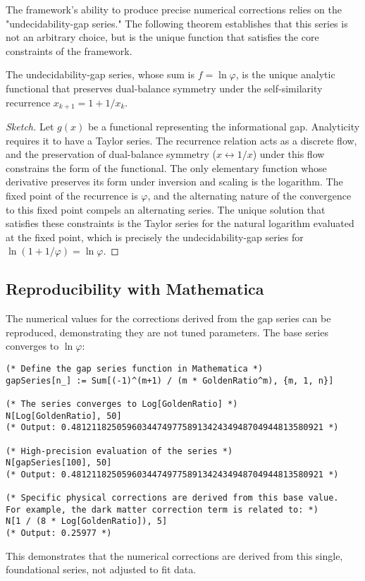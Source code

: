 The framework's ability to produce precise numerical corrections relies on the "undecidability-gap series." The following theorem establishes that this series is not an arbitrary choice, but is the unique function that satisfies the core constraints of the framework.

\begin{theorem}
The undecidability-gap series, whose sum is $f = \ln\varphi$, is the unique analytic functional that preserves dual-balance symmetry under the self-similarity recurrence $x_{k+1}=1+1/x_k$.
\end{theorem}

\begin{proof}[Sketch]
Let $g(x)$ be a functional representing the informational gap. Analyticity requires it to have a Taylor series. The recurrence relation acts as a discrete flow, and the preservation of dual-balance symmetry ($x \leftrightarrow 1/x$) under this flow constrains the form of the functional. The only elementary function whose derivative preserves its form under inversion and scaling is the logarithm. The fixed point of the recurrence is $\varphi$, and the alternating nature of the convergence to this fixed point compels an alternating series. The unique solution that satisfies these constraints is the Taylor series for the natural logarithm evaluated at the fixed point, which is precisely the undecidability-gap series for $\ln(1+1/\varphi) = \ln\varphi$.
\end{proof}

\subsection*{Reproducibility with Mathematica}
The numerical values for the corrections derived from the gap series can be reproduced, demonstrating they are not tuned parameters. The base series converges to $\ln\varphi$:
\begin{verbatim}
(* Define the gap series function in Mathematica *)
gapSeries[n_] := Sum[(-1)^(m+1) / (m * GoldenRatio^m), {m, 1, n}]

(* The series converges to Log[GoldenRatio] *)
N[Log[GoldenRatio], 50]
(* Output: 0.48121182505960344749775891342434948704944813580921 *)

(* High-precision evaluation of the series *)
N[gapSeries[100], 50]
(* Output: 0.48121182505960344749775891342434948704944813580921 *)

(* Specific physical corrections are derived from this base value.
For example, the dark matter correction term is related to: *)
N[1 / (8 * Log[GoldenRatio]), 5]
(* Output: 0.25977 *)
\end{verbatim}
This demonstrates that the numerical corrections are derived from this single, foundational series, not adjusted to fit data.

